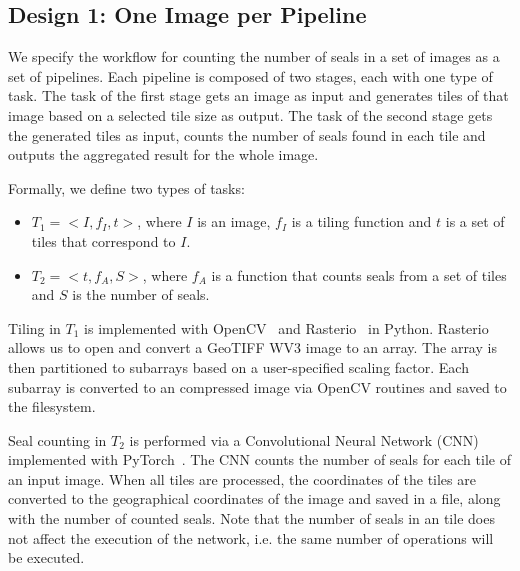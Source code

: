 \subsection{Design 1: One Image per Pipeline}
\label{ssec:approach1}\label{des1}



We specify the workflow for counting the number of seals in a set of images
as a set of pipelines. Each pipeline is composed of two stages, each with one
type of task. The task of the first stage gets an image as input and
generates tiles of that image based on a selected tile size as output. The
task of the second stage gets the generated tiles as input, counts the number
of seals found in each tile and outputs the aggregated result for the whole
image.

Formally, we define two types of tasks:
\begin{itemize}
	\item $T_{1} = <I, f_{I}, t>$, where $I$ is an image, $f_{I}$ is a tiling 
	function and $t$ is a set of tiles that correspond to $I$.
	\item $T_{2} = <t, f_{A}, S>$, where $f_{A}$ is a function that counts  
	seals from a set of tiles and $S$ is the number of seals.
\end{itemize}


Tiling in $T_{1}$ is implemented with OpenCV~\cite{bradski2000opencv} and
Rasterio~\cite{gillies2013rasterio} in Python. Rasterio allows us to open and
convert a GeoTIFF WV3 image to an array. The array is then partitioned to
sub\-arrays based on a user-specified scaling factor. Each sub\-array is
converted to an compressed image via OpenCV routines and saved to the
filesystem.

Seal counting in $T_{2}$ is performed via a Convolutional Neural Network
(CNN) implemented with PyTorch~\cite{paszke2017automatic}. The CNN counts
the number of seals for each tile of an input image. When all tiles are
processed, the coordinates of the tiles are converted to the geographical
coordinates of the image and saved in a file, along with the number of
counted seals. Note that the number of seals in an tile does not affect the 
execution of the network, i.e. the same number of operations will be executed.

